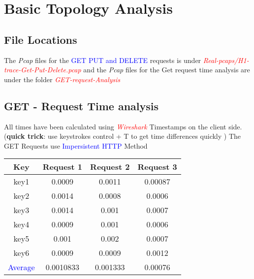 
\section{Basic Topology Analysis}

\subsection{File Locations}
The \textit{Pcap} files for the \textcolor{blue}{GET PUT and DELETE} requests is under \textit{\textcolor{red}{Real-pcaps/H1-trace-Get-Put-Delete.pcap}}
and the \textit{Pcap} files for the Get request time analysis are under the folder \textit{\textcolor{red}{GET-request-Analysis}}
\subsection{GET - Request Time analysis}
All times have been calculated using \textit{\textcolor{red}{Wireshark}} Timestamps on the client side.
(\textbf{quick trick}: use keystrokes control + T to get time differences quickly )
The GET Requests use \textcolor{blue}{Impersistent HTTP} Method
\\

\begin{center}
    \begin{tabular}{c | c | c | c}

        Key & Request 1 & Request 2 & Request 3 \\
        \hline
        key1 & 0.0009 & 0.0011 & 0.00087 \\
        \hline
        key2 &  0.0014 & 0.0008 &  0.0006\\ 
        \hline
        key3 &  0.0014 & 0.001 & 0.0007 \\
        \hline
        key4 &  0.0009& 0.001 & 0.0006\\
        \hline
        key5 &  0.001 &  0.002 & 0.0007\\
        \hline
        key6 &  0.0009 & 0.0009 & 0.0012\\
        \hline
        \textcolor{blue}{Average} & 0.0010833 & 0.001333 & 0.00076\\
        \hline 
    \end{tabular}
\end{center}
